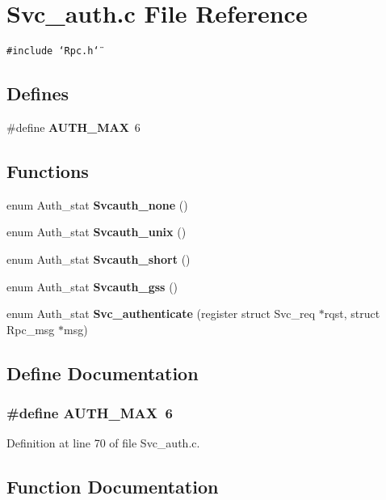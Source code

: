 \section{Svc\_\-auth.c File Reference}
\label{Svc__auth_8c}
{\tt \#include \char`\"{}Rpc.h\char`\"{}}\par
\subsection*{Defines}
\begin{CompactItemize}
\item 
\#define {\bf AUTH\_\-MAX}\ 6
\end{CompactItemize}
\subsection*{Functions}
\begin{CompactItemize}
\item 
enum Auth\_\-stat {\bf Svcauth\_\-none} ()
\item 
enum Auth\_\-stat {\bf Svcauth\_\-unix} ()
\item 
enum Auth\_\-stat {\bf Svcauth\_\-short} ()
\item 
enum Auth\_\-stat {\bf Svcauth\_\-gss} ()
\item 
enum Auth\_\-stat {\bf Svc\_\-authenticate} (register struct Svc\_\-req $\ast$rqst, struct Rpc\_\-msg $\ast$msg)
\end{CompactItemize}


\subsection{Define Documentation}
\subsubsection{\setlength{\rightskip}{0pt plus 5cm}\#define AUTH\_\-MAX\ 6}\label{Svc__auth_8c_a0}




Definition at line 70 of file Svc\_\-auth.c.

\subsection{Function Documentation}

